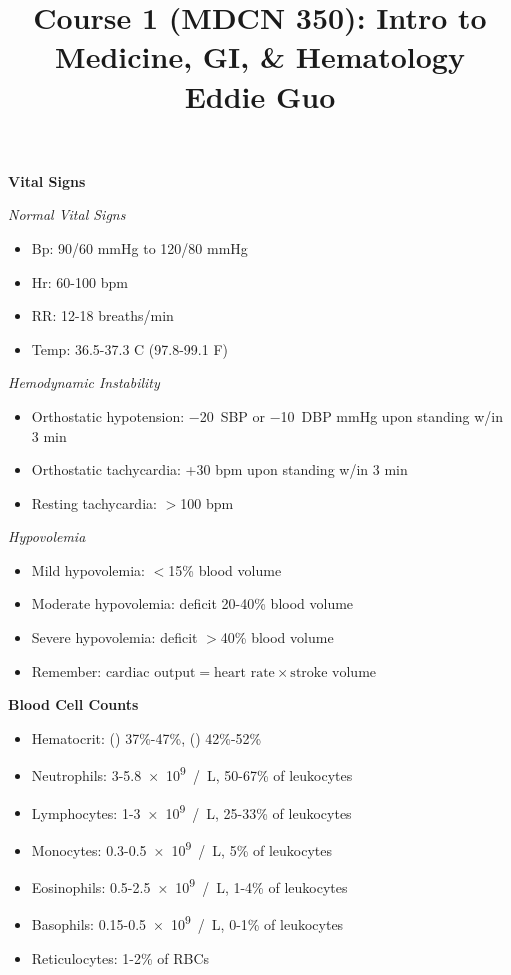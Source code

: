 \documentclass[twocolumn]{article}
\title{
	\vspace{-2em}
	\normalsize \textbf{Course 1 (MDCN 350): Intro to Medicine, GI, \& Hematology} \\
	\small Eddie Guo \\
	\dotfill
	\vspace{-5em}
}
\date{}
\begin{document}
\maketitle

\small

\textbf{Vital Signs}

\textit{Normal Vital Signs}
\vspace{-.5em}
\begin{itemize}
    \item Bp: 90/60 mmHg to 120/80 mmHg
    \item Hr: 60-100 bpm
    \item RR: 12-18 breaths/min
    \item Temp: 36.5-37.3 \degree C (97.8-99.1 \degree F)
\end{itemize} \vspace{-.5em}

\textit{Hemodynamic Instability}
\vspace{-.5em}
\begin{itemize}
    \item Orthostatic hypotension: \SI{-20}{SBP} or \SI{-10}{DBP} mmHg upon standing w/in 3 min
    \item Orthostatic tachycardia: +30 bpm upon standing w/in 3 min
    \item Resting tachycardia: $>$100 bpm
\end{itemize} \vspace{-.5em}

\textit{Hypovolemia}
\vspace{-.5em}
\begin{itemize}
    \item Mild hypovolemia: $<$15\% blood volume
    \item Moderate hypovolemia: deficit 20-40\% blood volume
    \item Severe hypovolemia: deficit $>$40\% blood volume
    \item Remember: $\text{cardiac output} = \text{heart rate} \times \text{stroke volume}$
\end{itemize} \vspace{-.5em}

\vspace{-.5em}
\dotfill

\textbf{Blood Cell Counts}
\vspace{-.5em}
\begin{itemize}
    \item Hematocrit: (\venus) 37\%-47\%, (\mars) 42\%-52\%
    \item Neutrophils: 3-\SI{5.8e9}{/L}, 50-67\% of leukocytes
    \item Lymphocytes: 1-\SI{3e9}{/L}, 25-33\% of leukocytes
    \item Monocytes: 0.3-\SI{0.5e9}{/L}, 5\% of leukocytes
    \item Eosinophils: 0.5-\SI{2.5e9}{/L}, 1-4\% of leukocytes
    \item Basophils: 0.15-\SI{0.5e9}{/L}, 0-1\% of leukocytes
    \item Reticulocytes: 1-2\% of RBCs
\end{itemize} \vspace{-.5em}
\end{document}
